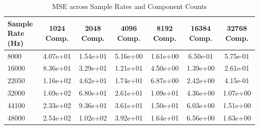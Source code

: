 \begin{table}[htbp]
\centering
\caption{MSE across Sample Rates and Component Counts}
\begin{tabular}{|l|c|c|c|c|c|c|}
\hline
Sample Rate (Hz) & 1024 Comp. & 2048 Comp. & 4096 Comp. & 8192 Comp. & 16384 Comp. & 32768 Comp. \\ \hline
8000 & 4.07e+01 & 1.54e+01 & 5.16e+00 & 1.61e+00 & 6.50e-01 & 5.75e-01 \\ \hline
16000 & 8.36e+01 & 3.29e+01 & 1.21e+01 & 4.50e+00 & 1.39e+00 & 2.61e-01 \\ \hline
22050 & 1.16e+02 & 4.62e+01 & 1.74e+01 & 6.87e+00 & 2.42e+00 & 4.15e-01 \\ \hline
32000 & 1.69e+02 & 6.80e+01 & 2.61e+01 & 1.09e+01 & 4.36e+00 & 1.07e+00 \\ \hline
44100 & 2.33e+02 & 9.36e+01 & 3.61e+01 & 1.50e+01 & 6.03e+00 & 1.51e+00 \\ \hline
48000 & 2.54e+02 & 1.02e+02 & 3.92e+01 & 1.64e+01 & 6.56e+00 & 1.63e+00 \\ \hline
\end{tabular}
\end{table}
